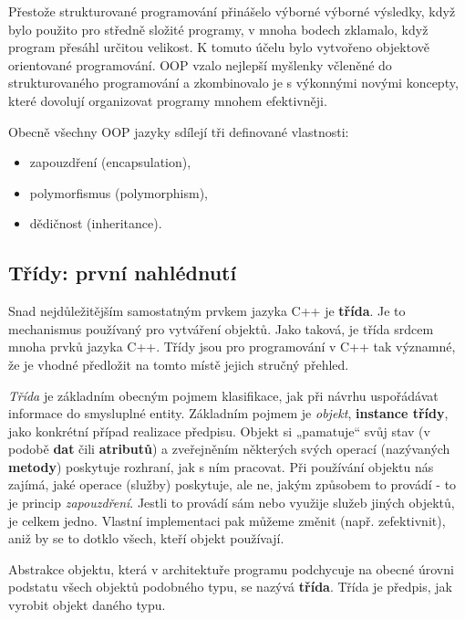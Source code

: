   Přestože strukturované programování přinášelo výborné výborné výsledky, když bylo použito pro středně složité programy, v mnoha
  bodech zklamalo, když program přesáhl určitou velikost. K tomuto účelu bylo vytvořeno objektově orientované programování. OOP
  vzalo nejlepší myšlenky včleněné do strukturovaného programování a zkombinovalo je s výkonnými novými koncepty, které dovolují
  organizovat programy mnohem efektivněji.

  Obecně všechny OOP jazyky sdílejí tři definované vlastnosti:
  \begin{itemize}
    \item zapouzdření (encapsulation),
    \item polymorfismus (polymorphism),
    \item dědičnost (inheritance).
  \end{itemize}

  \subsection{Třídy: první nahlédnutí}
    Snad nejdůležitějším samostatným prvkem jazyka C++ je \textbf{třída}. Je to mechanismus používaný pro vytváření objektů. Jako
    taková, je třída srdcem mnoha prvků jazyka C++. Třídy jsou pro programování v C++ tak významné, že je vhodné předložit na
    tomto místě jejich stručný přehled.

    \begin{definition}[Třída]
      \emph{Třída} je základním obecným pojmem klasifikace, jak při návrhu uspořádávat informace do smysluplné entity. Základním
      pojmem je \emph{objekt}, \textbf{instance třídy}, jako konkrétní případ realizace předpisu. Objekt si „pamatuje“ svůj stav
      (v podobě \textbf{dat} čili \textbf{atributů}) a zveřejněním některých svých operací (nazývaných \textbf{metody}) poskytuje
      rozhraní, jak s ním pracovat. Při používání objektu nás zajímá, jaké operace (služby) poskytuje, ale ne, jakým způsobem to
      provádí - to je princip \emph{zapouzdření}. Jestli to provádí sám nebo využije služeb jiných objektů, je celkem jedno.
      Vlastní implementaci pak můžeme změnit (např. zefektivnit), aniž by se to dotklo všech, kteří objekt používají.

      Abstrakce objektu, která v architektuře programu podchycuje na obecné úrovni podstatu všech objektů podobného typu, se
      nazývá \textbf{třída}.
      Třída je předpis, jak vyrobit objekt daného typu.
    \end{definition}
    
